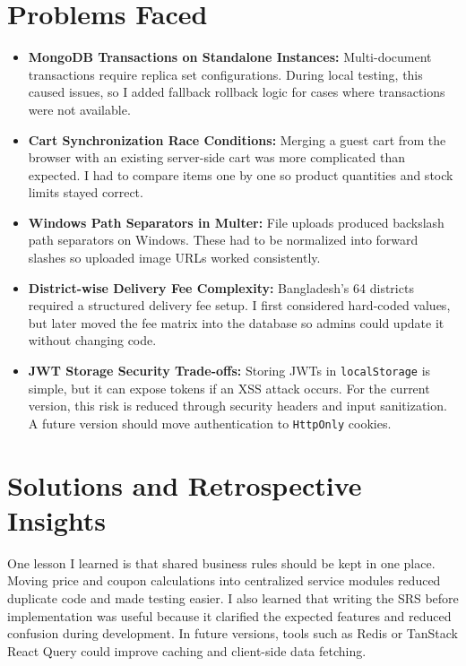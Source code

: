 \documentclass[12pt,a4paper,oneside]{report}
\begin{document}
\section{Problems Faced}
\begin{itemize}
    \item \textbf{MongoDB Transactions on Standalone Instances:} Multi-document transactions require replica set configurations. During local testing, this caused issues, so I added fallback rollback logic for cases where transactions were not available.
    \item \textbf{Cart Synchronization Race Conditions:} Merging a guest cart from the browser with an existing server-side cart was more complicated than expected. I had to compare items one by one so product quantities and stock limits stayed correct.
    \item \textbf{Windows Path Separators in Multer:} File uploads produced backslash path separators on Windows. These had to be normalized into forward slashes so uploaded image URLs worked consistently.
    \item \textbf{District-wise Delivery Fee Complexity:} Bangladesh's 64 districts required a structured delivery fee setup. I first considered hard-coded values, but later moved the fee matrix into the database so admins could update it without changing code.
    \item \textbf{JWT Storage Security Trade-offs:} Storing JWTs in \texttt{localStorage} is simple, but it can expose tokens if an XSS attack occurs. For the current version, this risk is reduced through security headers and input sanitization. A future version should move authentication to \texttt{HttpOnly} cookies.
\end{itemize}

\section{Solutions and Retrospective Insights}
One lesson I learned is that shared business rules should be kept in one place. Moving price and coupon calculations into centralized service modules reduced duplicate code and made testing easier. I also learned that writing the SRS before implementation was useful because it clarified the expected features and reduced confusion during development. In future versions, tools such as Redis or TanStack React Query could improve caching and client-side data fetching.

\end{document}
